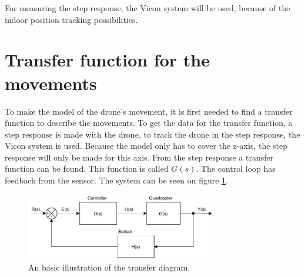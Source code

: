 For measuring the step response, the Vicon system will be used, because of the indoor position tracking possibilities.


\section{Transfer function for the movements}\label{s:transfer_function}
To make the model of the drone's movement, it is first needed to find a transfer function to describe the movements. To get the data for the transfer function, a step response is made with the drone, to track the drone in the step response, the Vicon system is used. Because the model only has to cover the z-axis, the step response will only be made for this axis. From the step response a transfer function can be found. This function is called $G(s)$. 
The control loop has feedback from the sensor. The system can be seen on figure \ref{fig:transfer_function}.
\begin{figure}[H]
    \centering
    \includegraphics[width=0.75\textwidth]{figures/ch_design/transfer_function.pdf}
    \caption{An basic illustration of the transfer diagram.}
    \label{fig:transfer_function}
\end{figure}

